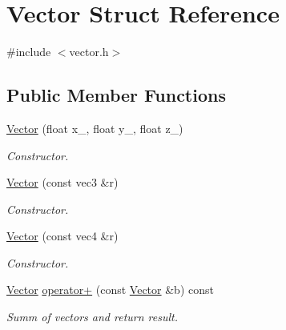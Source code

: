 \hypertarget{struct_vector}{}\section{Vector Struct Reference}
\label{struct_vector}


{\ttfamily \#include $<$vector.\+h$>$}

\subsection*{Public Member Functions}
\begin{DoxyCompactItemize}
\item 
\mbox{\label{struct_vector_a19d705a4f487cc6bff71030d1655dbb9}} 
\mbox{\hyperlink{struct_vector_a19d705a4f487cc6bff71030d1655dbb9}{Vector}} (float x\+\_, float y\+\_, float z\+\_)
\begin{DoxyCompactList}\small\item\em Constructor. \end{DoxyCompactList}\item 
\mbox{\label{struct_vector_acdc4848c4a0ac5cdcc0c0b85a2e6aac8}} 
\mbox{\hyperlink{struct_vector_acdc4848c4a0ac5cdcc0c0b85a2e6aac8}{Vector}} (const vec3 \&r)
\begin{DoxyCompactList}\small\item\em Constructor. \end{DoxyCompactList}\item 
\mbox{\label{struct_vector_aebe4c3f60c23167ee70063b2f8c08abc}} 
\mbox{\hyperlink{struct_vector_aebe4c3f60c23167ee70063b2f8c08abc}{Vector}} (const vec4 \&r)
\begin{DoxyCompactList}\small\item\em Constructor. \end{DoxyCompactList}\item 
\mbox{\label{struct_vector_a292963338c3d59c00ea9f89b0d7d999e}} 
\mbox{\hyperlink{struct_vector}{Vector}} \mbox{\hyperlink{struct_vector_a292963338c3d59c00ea9f89b0d7d999e}{operator+}} (const \mbox{\hyperlink{struct_vector}{Vector}} \&b) const
\begin{DoxyCompactList}\small\item\em Summ of vectors and return result. \end{DoxyCompactList}\item 

\end{DoxyCompactItemize}
